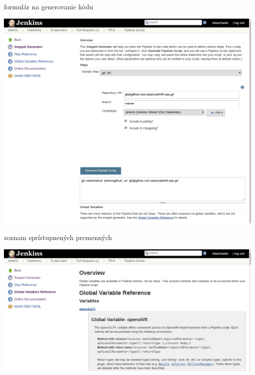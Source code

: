 \documentclass[bigger]{beamer}
\begin{document}
\begin{frame}[label={sec:orgc9076a3}]{formulár na generovanie kódu}
\begin{center}
\includegraphics[width=.9\linewidth]{./021replay.png}
\end{center}
\end{frame}

\begin{frame}[label={sec:org1b44b9a}]{zoznam sprístupnených premenných}
\begin{center}
\includegraphics[width=.9\linewidth]{./022variables.png}
\end{center}
\end{frame}
\end{document}
